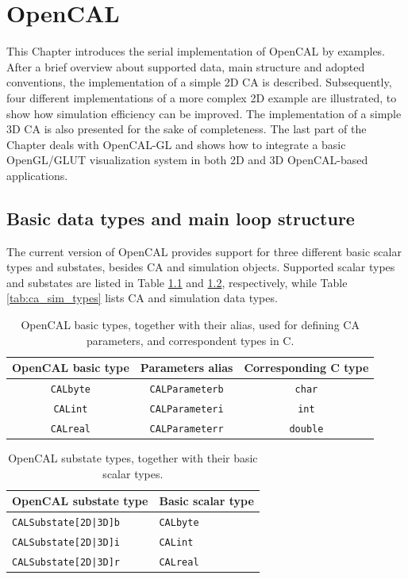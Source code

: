 \chapter{OpenCAL}\label{ch:opencal}

This Chapter introduces the serial implementation of OpenCAL by
examples. After a brief overview about supported data, main structure
and adopted conventions, the implementation of a simple 2D CA is described. Subsequently, four different
implementations of a more complex 2D example are illustrated, to show
how simulation efficiency can be improved. The implementation of a
simple 3D CA is also presented for the sake of completeness. The last
part of the Chapter deals with OpenCAL-GL and shows how to integrate a
basic OpenGL/GLUT visualization system in both 2D and 3D OpenCAL-based
applications.


\section{Basic data types and main loop structure}

The current version of OpenCAL provides support for three different
basic scalar types and substates, besides CA and simulation
objects. Supported scalar types and substates are listed in Table
\ref{tab:basic_types} and \ref{tab:substate_types}, respectively,
while Table \ref{tab:ca_sim_types} lists CA and simulation data types.

\begin{table}
  \centering
  \begin{tabular}{c|c|c}
    \hline
    OpenCAL basic type & Parameters alias & Corresponding C type \\
    \hline
    \verb'CALbyte' & \verb'CALParameterb' & \verb'char'  \\
    \verb'CALint'  & \verb'CALParameteri' & \verb'int'  \\
    \verb'CALreal' & \verb'CALParameterr' & \verb'double'  \\
    \hline
  \end{tabular}
  \caption{OpenCAL basic types, together with their alias, used for
    defining CA parameters, and correspondent types in C.}
  \label{tab:basic_types}
\end{table}

\begin{table}
  \centering
  \begin{tabular}{l|l}
    \hline
    OpenCAL substate type & Basic scalar type \\
    \hline
    \verb'CALSubstate[2D|3D]b' & \verb'CALbyte'\\
    \verb'CALSubstate[2D|3D]i' & \verb'CALint' \\
    \verb'CALSubstate[2D|3D]r' & \verb'CALreal'\\
    \hline
  \end{tabular}
  \caption{OpenCAL substate types, together with their basic scalar
    types.}
  \label{tab:substate_types}
\end{table}

